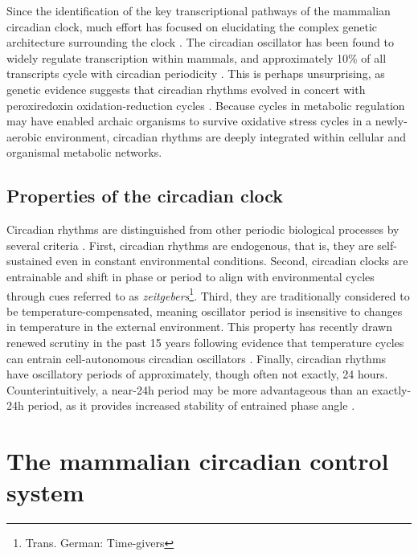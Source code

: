 Since the identification of the key transcriptional pathways of the mammalian circadian clock, much effort has focused on elucidating the complex genetic architecture surrounding the clock \cite{Zhang2009, Takahashi2016}.
The circadian oscillator has been found to widely regulate transcription within mammals, and approximately 10\% of all transcripts cycle with circadian periodicity \cite{Lowrey2004}.
This is perhaps unsurprising, as genetic evidence suggests that circadian rhythms evolved in concert with peroxiredoxin oxidation-reduction cycles \cite{Edgar2012}.
Because cycles in metabolic regulation may have enabled archaic organisms to survive oxidative stress cycles in a newly-aerobic environment, circadian rhythms are deeply integrated within cellular and organismal metabolic networks.

\subsection*{Properties of the circadian clock}
Circadian rhythms are distinguished from other periodic biological processes by several criteria \cite{Dunlap2004}.
First, circadian rhythms are endogenous, that is, they are self-sustained even in constant environmental conditions.
Second, circadian clocks are entrainable and shift in phase or period to align with environmental cycles through cues referred to as \textit{zeitgebers}\footnote{Trans. German: Time-givers}.
Third, they are traditionally considered to be temperature-compensated, meaning oscillator period is insensitive to changes in temperature in the external environment.
This property has recently drawn renewed scrutiny in the past 15 years following evidence that temperature cycles can entrain cell-autonomous circadian oscillators \cite{Herzog2003}.
Finally, circadian rhythms have oscillatory periods of approximately, though often not exactly, 24 hours.
Counterintuitively, a near-24h period may be more advantageous than an exactly-24h period, as it provides increased stability of entrained phase angle \cite{Dunlap2004}.

\section{The mammalian circadian control system}

